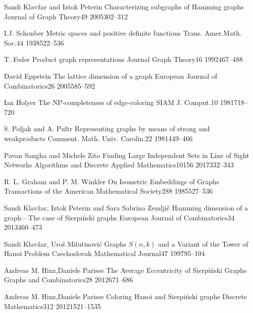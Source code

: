 \documentclass[12pt,a4paper,titlepage,openany]{report}
\begin{document}
\begin{thebibliography}{99}
  \articleInJournalManyAuthors
    {Sandi Klav\v zar and Iztok Peterin}
    {Characterizing subgraphs of Hamming graphs}
   {Journal of Graph Theory}{49}
   {2005}{302--312}   

\articleInJournalOneAuthor
    {I.J. Schonber}
    {Metric spaces and positive definite functions}
   {Trans. Amer.Math. Soc.}{44}
   {1938}{522--536}

\articleInJournalOneAuthor
    {T. Feder}
    {Product graph representations}
   {Journal Graph Theory}{16}
   {1992}{467--488}
   
\articleInJournalOneAuthor
    {David Eppstein}
    {The lattice dimension of a graph}
   {European Journal of Combinatorics}{26}
   {2005}{585--592} 
   
\articleInJournalOneAuthor
    {Ian Holyer}
    {The NP-completeness of edge-coloring}
   {SIAM J. Comput.}{10}
   {1981}{718--720}    

  \articleInJournalManyAuthors
    {S. Poljak and A. Pultr}
    {Representing graphs by means of strong and weakproducts}
   {Comment. Math. Univ. Carolin.}{22}
   {1981}{449--466}  
   
  \articleInJournalManyAuthors
    {Pavan Sangha and Michele Zito}
    {Finding Large Independent Sets in Line of Sight Networks}
   {Algorithms and Discrete Applied Mathematics}{10156}
   {2017}{332--343}    
   
  \articleInJournalManyAuthors
    {R. L. Graham and P. M. Winkler}
    {On Isometric Embeddings of Graphs}
   {Transactions of the American Mathematical Society}{288}
   {1985}{527--536}    

  \articleInJournalManyAuthors
    {Sandi Klav\v zar, Iztok Peterin and Sara Sabrina Zemlji\v c}
    {Hamming dimension of a graph—The case of Sierpi\'nski graphs}
   {European Journal of Combinatorics}{34}
   {2013}{460--473}

  \articleInJournalManyAuthors
    {Sandi Klav\v zar, Uro\v s Milutinovi\' c}
    {Graphs $S(n, k)$ and a Variant of the Tower of Hanoi Problem}
   {Czechoslovak Mathematical Journal}{47}
   {1997}{95--104}

  \articleInJournalManyAuthors
    {Andreas M. Hinz,Daniele Parisse}
    {The Average Eccentricity of Sierpiński Graphs}
   {Graphs and Combinatorics}{28}
   {2012}{671--686}
   
  \articleInJournalManyAuthors
    {Andreas M. Hinz,Daniele Parisse}
    {Coloring Hanoi and Sierpiński graphs}
   {Discrete Mathematics}{312}
   {2012}{1521--1535}   

\end{thebibliography}
\newpage
\end{document}
